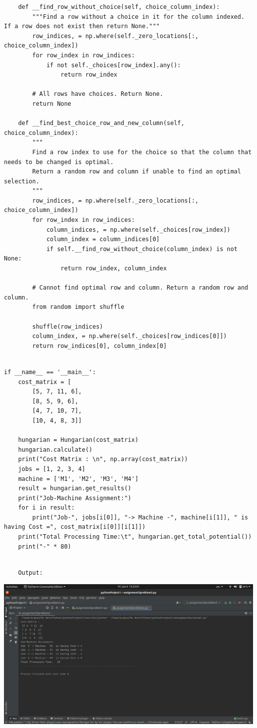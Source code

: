 \documentclass[12pt, letterpaper, twoside]{book}
\begin{document}
\begin{lstlisting}
    def __find_row_without_choice(self, choice_column_index):
        """Find a row without a choice in it for the column indexed. If a row does not exist then return None."""
        row_indices, = np.where(self._zero_locations[:, choice_column_index])
        for row_index in row_indices:
            if not self._choices[row_index].any():
                return row_index

        # All rows have choices. Return None.
        return None

    def __find_best_choice_row_and_new_column(self, choice_column_index):
        """
        Find a row index to use for the choice so that the column that needs to be changed is optimal.
        Return a random row and column if unable to find an optimal selection.
        """
        row_indices, = np.where(self._zero_locations[:, choice_column_index])
        for row_index in row_indices:
            column_indices, = np.where(self._choices[row_index])
            column_index = column_indices[0]
            if self.__find_row_without_choice(column_index) is not None:
                return row_index, column_index

        # Cannot find optimal row and column. Return a random row and column.
        from random import shuffle

        shuffle(row_indices)
        column_index, = np.where(self._choices[row_indices[0]])
        return row_indices[0], column_index[0]

\end{lstlisting}
\pagebreak
\begin{lstlisting}

if __name__ == '__main__':
    cost_matrix = [
        [5, 7, 11, 6],
        [8, 5, 9, 6],
        [4, 7, 10, 7],
        [10, 4, 8, 3]]

    hungarian = Hungarian(cost_matrix)
    hungarian.calculate()
    print("Cost Matrix : \n", np.array(cost_matrix))
    jobs = [1, 2, 3, 4]
    machine = ['M1', 'M2', 'M3', 'M4']
    result = hungarian.get_results()
    print("Job-Machine Assignment:")
    for i in result:
        print("Job-", jobs[i[0]], "-> Machine -", machine[i[1]], " is having Cost =", cost_matrix[i[0]][i[1]])
    print("Total Processing Time:\t", hungarian.get_total_potential())
    print("-" * 80)

\end{lstlisting}
\pagebreak
\begin{lstlisting}

	Output:

\end{lstlisting}

\includegraphics[width=550pt]{Output2}
\end{document}

